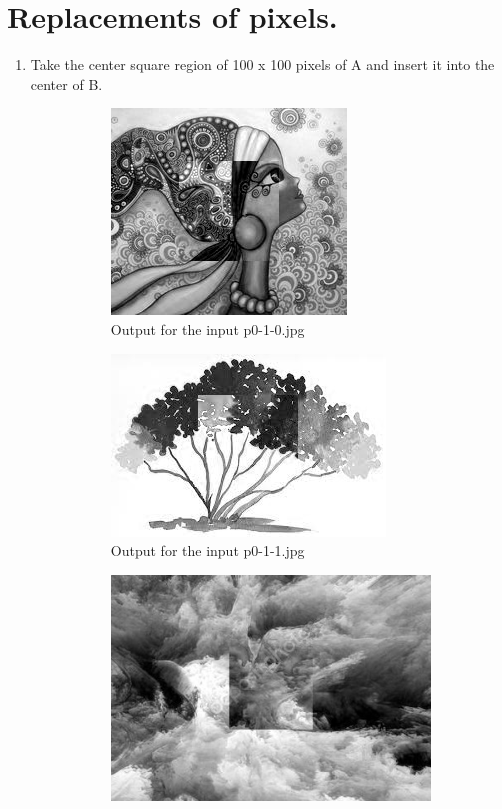 \section{Replacements of pixels.}
\begin{enumerate}[label=\emph{\alph*)}]
\item Take the center square region of 100 x 100 pixels of A and insert it into the center of B.
\begin{figure}[h!]
\centering
\begin{subfigure}{0.5\textwidth}
  \centering
  \includegraphics[width=0.5\linewidth]{../output/p0-3-a-0.jpg}
  \caption{Output for the input p0-1-0.jpg}
  \label{fig:sfig1}
\end{subfigure}%
\begin{subfigure}{0.5\textwidth}
  \centering
  \includegraphics[width=0.5\linewidth]{../output/p0-3-a-1.jpg}
  \caption{Output for the input p0-1-1.jpg}
  \label{fig:sfig2}
\end{subfigure}
\begin{subfigure}{0.5\textwidth}
  \centering
  \includegraphics[width=0.5\linewidth]{../output/p0-3-a-2.jpg}

\end{subfigure}
\end{figure}
\end{enumerate}

